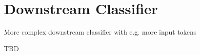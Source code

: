 \section{Downstream Classifier}
\label{chp:future_work:sec:downstream_classifier}
More complex downstream classifier with e.g. more input tokens

TBD
